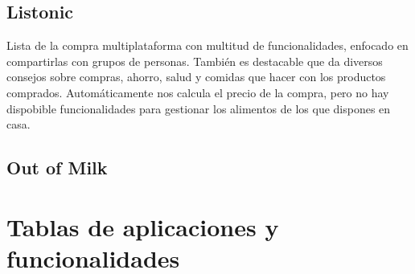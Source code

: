 \subsection{Listonic}
Lista de la compra multiplataforma con multitud de funcionalidades, enfocado en compartirlas con grupos de personas. También es destacable que da diversos consejos sobre compras, ahorro, salud y comidas que hacer con los productos comprados. Automáticamente nos calcula el precio de la compra, pero no hay dispobible funcionalidades para gestionar los alimentos de los que dispones en casa.

\subsection{Out of Milk}

\section{Tablas de aplicaciones y funcionalidades}
